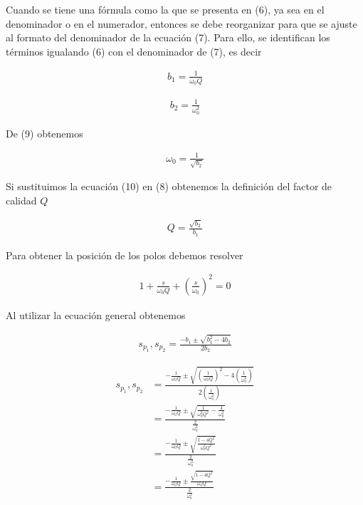 \documentclass{article}
\begin{document}
Cuando se tiene una fórmula como la que se presenta en (6), ya sea en el denominador o en el numerador, entonces se debe reorganizar para que se ajuste al formato del denominador de la ecuación (7). Para ello, se identifican los términos igualando (6) con el denominador de (7), es decir

\begin{align}
	b_1 = \frac{1}{\omega_0 Q}
\end{align}

\begin{align}
	b_2 = \frac{1}{\omega_0^2}
\end{align}

De (9) obtenemos

\begin{align}
	\omega_0 = \frac{1}{ \sqrt{b_2} }
\end{align}

Si sustituimos la ecuación (10) en (8) obtenemos la definición del factor de calidad $Q$

\begin{align}
	Q = \frac{\sqrt{b_2}}{b_1}
\end{align}

Para obtener la posición de los polos debemos resolver

\begin{align}
	1 + \frac{s}{\omega_0 Q} + \left( \frac{s}{\omega_0} \right)^2 = 0
\end{align}

Al utilizar la ecuación general obtenemos

\begin{align}
	s_{p_1}, s_{p_2} = \frac{-b_1 \pm \sqrt{b_1^2 - 4b_2} }{2b_2}
\end{align}

\begin{align}
		s_{p_1}, s_{p_2} &= \frac{- \frac{1}{\omega_0 Q} \pm \sqrt{ \left( \frac{1}{\omega_0 Q} \right)^2  - 4 \left( \frac{1}{\omega_0^2} \right)} }{2 \left( \frac{1}{\omega_0^2} \right) } \nonumber \\
		&= \frac{- \frac{1}{\omega_0 Q} \pm \sqrt{ \frac{1}{\omega_0^2 Q^2}  - \frac{4}{\omega_0^2}} }{ \frac{2}{\omega_0^2} } \nonumber \\
		&= \frac{- \frac{1}{\omega_0 Q} \pm \sqrt{ \frac{1 - 4Q^2}{\omega_0^2 Q^2}} }{ \frac{2}{\omega_0^2} } \nonumber \\
		&= \frac{- \frac{1}{\omega_0 Q} \pm \frac{\sqrt{ 1 - 4Q^2 }}{\omega_0 Q}  }{ \frac{2}{\omega_0^2} } \nonumber
\end{align}
\end{document}
